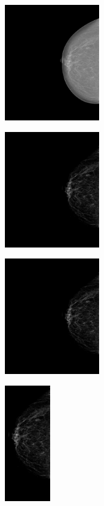 \begin{figure}[h]
	\centering
	\begin{subfigure}{4.2 cm}
		\centering
                \includegraphics[height = 5cm]{plots/mammogram.png}
        \end{subfigure}
	\begin{subfigure}{4.2 cm}
		\centering
                \includegraphics[height = 5cm]{plots/mammogram_enhanced.png}
        \end{subfigure}
	\begin{subfigure}{4.2 cm}
		\centering
                \includegraphics[height = 5cm]{plots/mammogram_resized.png}
        \end{subfigure}
	\begin{subfigure}{2.4 cm}
		\centering
                \includegraphics[height = 5cm]{plots/mammogram_v1.png}

\end{subfigure}
\end{figure}
